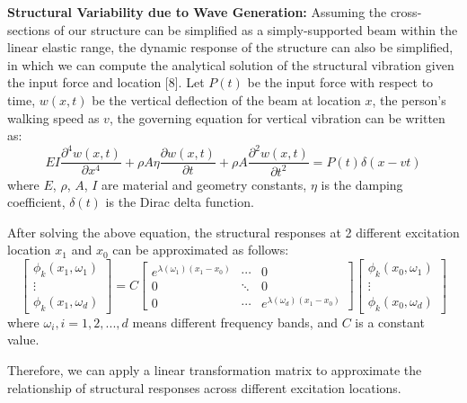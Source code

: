 \documentclass[11pt,letter]{article}
\begin{document}
\begin{multicols*}{2}
\textbf{Structural Variability due to Wave Generation:} Assuming the cross-sections of our structure can be simplified as a simply-supported beam within the linear elastic range, the dynamic response of the structure can also be simplified, in which we can compute the analytical solution of the structural vibration given the input force and location [8]. Let $P(t)$ be the input force with respect to time, $w(x,t)$ be the vertical deflection of the beam at location $x$, the person's walking speed as $v$, the governing equation for vertical vibration can be written as:
 \begin{equation}
    EI\frac{\partial^4 w(x,t)}{\partial x^4} + \rho A \eta \frac{\partial w(x,t)}{\partial t} + \rho A \frac{\partial^2 w(x,t)}{\partial t^2} = P(t)\delta(x-vt)
    \label{eq:dynamics}
 \end{equation}
 where $E$, $\rho$, $A$, $I$ are material and geometry constants, $\eta$ is the damping coefficient, $\delta(t)$ is the Dirac delta function.

After solving the above equation, the structural responses at 2 different excitation location $x_1$ and $x_0$ can be approximated as follows:
\begin{equation}
    \begin{bmatrix}
    \phi_k(x_1, \omega_1)\\
    \vdots\\
    \phi_k(x_1, \omega_d)
    \end{bmatrix}
    = C
    \begin{bmatrix}
    e^{\lambda(\omega_1)(x_1-x_0)} & \cdots & 0\\
    0 & \ddots & 0\\
    0 & \cdots & e^{\lambda(\omega_d)(x_1-x_0)}
    \end{bmatrix}
    \begin{bmatrix}
    \phi_k(x_0, \omega_1)\\
    \vdots\\
    \phi_k(x_0, \omega_d)
    \end{bmatrix}
\end{equation}
where $\omega_i, i = 1, 2, ..., d$ means different frequency bands, and $C$ is a constant value.

Therefore, we can apply a linear transformation matrix to approximate the relationship of structural responses across different excitation locations.


\end{multicols*}
\end{document}
